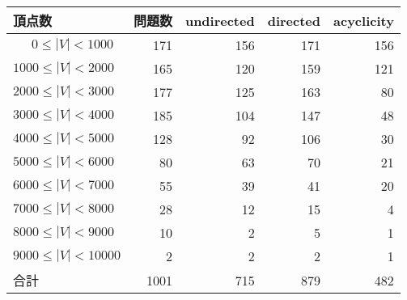 \begin{table}[t]\scriptsize
  \centering
  \renewcommand{\arraystretch}{1.2}
  \begin{tabular}{lr|rrr}
    頂点数 & 問題数 & \textsf{undirected} & \textsf{directed} & \textsf{acyclicity}\\
   \hline
    $\:\:\:\:\:\,\, 0 \leq |V| < 1000$     & 171   & 156   & \alert{171}   & 156  \\ %
    $1000 \leq |V| < 2000$  & 165   & 120   & \alert{159}   & 121  \\
    $2000 \leq |V| < 3000$  & 177   & 125   & \alert{163}   & 80   \\
    $3000 \leq |V| < 4000$  & 185   & 104   & \alert{147}   & 48   \\
    $4000 \leq |V| < 5000$  & 128   & 92    & \alert{106}   & 30   \\
    $5000 \leq |V| < 6000$  & 80    & 63    & \alert{70}    & 21   \\
    $6000 \leq |V| < 7000$  & 55    & 39    & \alert{41}    & 20   \\
    $7000 \leq |V| < 8000$  & 28    & 12    & \alert{15}    & 4    \\
    $8000 \leq |V| < 9000$  & 10    & 2     & \alert{5}     & 1    \\
    $9000 \leq |V| < 10000$  & 2     & \alert{2}     & \alert{2}     & 1    \\
   \hline
    合計 & 1001 & 715   & \alert{879}   & 482  
  \end{tabular}
\end{table}
